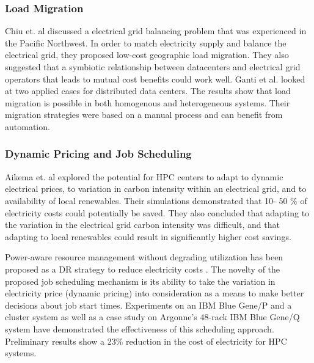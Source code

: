 \subsubsection{Load Migration}
Chiu et. al \cite{chiu_electric_2012} discussed a electrical grid balancing problem that was experienced in the Pacific Northwest. In order to match electricity supply and balance the electrical grid, they proposed low-cost geographic load migration. They also suggested that a symbiotic relationship between datacenters and electrical grid operators that leads to mutual cost benefits could work well.  Ganti et al. \cite{Ghatikar2012b} looked at two applied cases for distributed data centers. The results show that load migration is possible in both homogenous and heterogeneous systems. Their migration strategies were based on a manual process and can benefit from automation.

\subsubsection{Dynamic Pricing and Job Scheduling}
Aikema et. al \cite{aikema_electrical_2011} explored the potential for HPC centers to adapt to dynamic electrical prices, to variation in carbon intensity within an electrical grid, and to availability of local renewables. Their simulations demonstrated that 10- 50 \% of electricity costs could potentially be saved. They also concluded that adapting to the variation in the electrical grid carbon intensity was difficult, and that adapting to local renewables could result in significantly higher cost savings.

Power-aware resource management without degrading utilization has been proposed as a DR strategy to reduce electricity costs \cite{yang_integrating_2013,zhou_reducing_2013}. The novelty of the proposed job scheduling mechanism is its ability to take the variation in electricity price (dynamic pricing) into consideration as a means to make better decisions about job start times. Experiments on an IBM Blue Gene/P and a cluster system as well as a case study on Argonne's 48-rack IBM Blue Gene/Q system have demonstrated the effectiveness of this scheduling approach. Preliminary results show a 23\% reduction in the cost of electricity for HPC systems.
